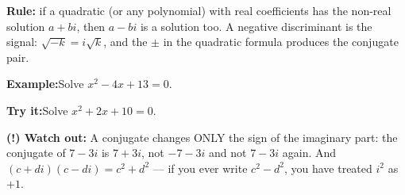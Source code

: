 \documentclass[12pt]{article}
\begin{document}
\begin{formulabox}\textbf{Rule:} if a quadratic (or any polynomial) with real
coefficients has the non-real solution $a + bi$, then $a - bi$ is a solution too. A
negative discriminant is the signal: $\sqrt{-k} = i\sqrt{k}$, and the $\pm$ in the
quadratic formula produces the conjugate pair.
\end{formulabox}
\begin{examplebox}\textbf{Example:}\quad Solve $x^2 - 4x + 13 = 0$.
\end{examplebox}
\begin{tryitbox}\textbf{Try it:}\quad Solve $x^2 + 2x + 10 = 0$.\\[2pt]
\end{tryitbox}

\begin{watchoutbox}\textbf{(!) Watch out:} A conjugate changes ONLY the sign of the
imaginary part: the conjugate of $7 - 3i$ is $7 + 3i$, not $-7 - 3i$ and not $7 - 3i$
again. And $(c + di)(c - di) = c^2 + d^2$ --- if you ever write $c^2 - d^2$, you have
treated $i^2$ as $+1$.
\end{watchoutbox}
\end{document}
